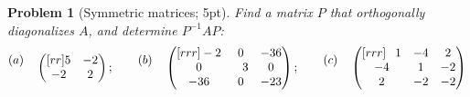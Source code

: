 \documentclass[12pt,a4]{article}
\newtheorem{problem}{Problem}
\begin{document}
\begin{problem}[Symmetric matrices; 5pt]\rm
Find a matrix $P$ that orthogonally diagonalizes $A$, and determine $P^{-1}AP$:
\[
\begin{matrix}
(a) \\ {}
\end{matrix}\quad \begin{pmatrix}[rr]
5 & -2 \\ -2 & 2
\end{pmatrix}; \qquad
\begin{matrix}
(b) \\ {}
\end{matrix}\quad\begin{pmatrix}[rrr]
-2 & 0 & -36 \\ 0 & \hphantom{-}3 & 0 \\ -36 & 0 & -23
\end{pmatrix};  \qquad
\begin{matrix}
(c) \\ {}
\end{matrix}\quad\begin{pmatrix}[rrr]
\hphantom{-}1 & -4 & 2 \\ -4 & 1 & -2 \\ 2 & -2 & -2
\end{pmatrix}
\]
\end{problem}
\end{document}
